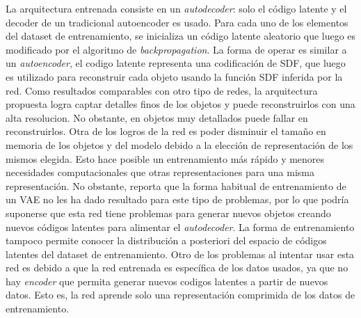 \documentclass[spanish]{article}
\begin{document}
La arquitectura entrenada consiste en un \textit{autodecoder}: solo el
código latente y el decoder de un tradicional autoencoder es usado. Para
cada uno de los elementos del dataset de entrenamiento, se inicializa un
código latente aleatorio que luego es modificado por el algoritmo de
\textit{backpropagation}. La forma de operar es similar a un
\textit{autoencoder}, el codigo latente representa una codificación de SDF,
que luego es utilizado para reconstruir cada objeto usando la función SDF
inferida por la red. Como resultados comparables con otro tipo de redes,
la arquitectura propuesta logra captar detalles finos de los objetos y
puede reconstruirlos con una alta resolucion. No obstante, en objetos
muy detallados puede fallar en reconstruirlos. Otra de los logros de la
red es poder disminuir el tamaño en memoria de los objetos y del modelo
debido a la elección de representación de los mismos elegida. Esto hace
posible un entrenamiento más rápido y menores necesidades computacionales
que otras representaciones para una misma representación. No obstante,
\cite{Park2019} reporta que la forma habitual de entrenamiento de un
VAE no les ha dado resultado para este tipo de problemas, por lo que
podría suponerse que esta red tiene problemas para generar nuevos objetos %
creando nuevos códigos latentes para alimentar el \textit{autodecoder}.
La forma de entrenamiento tampoco permite conocer la distribución a
posteriori del espacio de códigos latentes del dataset de entrenamiento.
Otro de los problemas al intentar usar esta red es debido a que la red
entrenada es específica de los datos usados, ya que no hay
\textit{encoder} que permita generar nuevos codigos latentes a partir
de nuevos datos. Esto es, la red aprende solo una representación
comprimida de los datos de entrenamiento.

\end{document}
